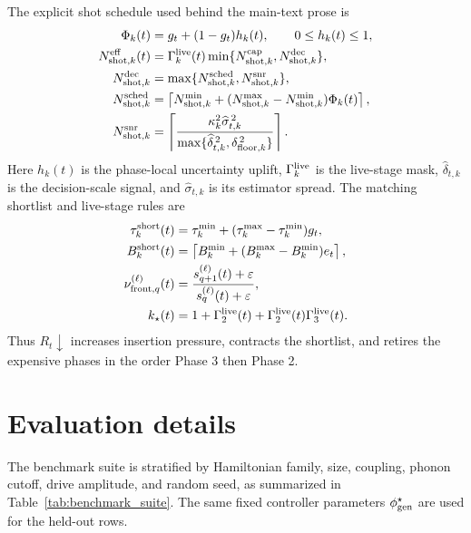 \documentclass[
  reprint,
  amsmath,
  amssymb,
  aps,
  pra,
  nofootinbib,
  superscriptaddress,
  floatfix
]{revtex4-2}
\newcommand{\eps}{\varepsilon}
\begin{document}
The explicit shot schedule used behind the main-text prose is
\begin{equation}
\begin{aligned}
\Phi_k(t)&=g_t+(1-g_t)h_k(t),\qquad 0\le h_k(t)\le1,\\
N_{{\rm shot},k}^{\rm eff}(t)
&=\Gamma_k^{\rm live}(t)
\min\{N_{{\rm shot},k}^{\rm cap},N_{{\rm shot},k}^{\rm dec}\},\\
N_{{\rm shot},k}^{\rm dec}
&=\max\{N_{{\rm shot},k}^{\rm sched},N_{{\rm shot},k}^{\rm snr}\},\\
N_{{\rm shot},k}^{\rm sched}
&=\left\lceil N_{{\rm shot},k}^{\min}
+(N_{{\rm shot},k}^{\max}-N_{{\rm shot},k}^{\min})\Phi_k(t)\right\rceil,\\
N_{{\rm shot},k}^{\rm snr}
&=\left\lceil
\frac{\kappa_k^2\widehat\sigma_{t,k}^{\,2}}
{\max\{\widehat\delta_{t,k}^{\,2},\delta_{{\rm floor},k}^{\,2}\}}
\right\rceil .
\end{aligned}
\label{eq:appendix_shot_schedule}
\end{equation}
Here $h_k(t)$ is the phase-local uncertainty uplift, $\Gamma_k^{\rm live}$ is the live-stage mask, $\widehat\delta_{t,k}$ is the decision-scale signal, and $\widehat\sigma_{t,k}$ is its estimator spread. The matching shortlist and live-stage rules are
\begin{equation}
\begin{aligned}
\tau_k^{\rm short}(t)&=\tau_k^{\min}+(\tau_k^{\max}-\tau_k^{\min})g_t,\\
B_k^{\rm short}(t)&=
\left\lceil B_k^{\min}
+(B_k^{\max}-B_k^{\min})e_t\right\rceil,\\
\nu_{{\rm front},q}^{(\ell)}(t)
&=\frac{s_{q+1}^{(\ell)}(t)+\eps}{s_q^{(\ell)}(t)+\eps},\\
k_{\star}(t)&=1+\Gamma_2^{\rm live}(t)
+\Gamma_2^{\rm live}(t)\Gamma_3^{\rm live}(t).
\end{aligned}
\label{eq:appendix_shortlist_live_stage}
\end{equation}
Thus $R_t\downarrow$ increases insertion pressure, contracts the shortlist, and retires the expensive phases in the order Phase 3 then Phase 2.

\section{Evaluation details}
\label{app:evaluation_details}

The benchmark suite is stratified by Hamiltonian family, size, coupling, phonon cutoff, drive amplitude, and random seed, as summarized in Table~\ref{tab:benchmark_suite}. The same fixed controller parameters $\phi_{\rm gen}^{\star}$ are used for the held-out rows.
\end{document}
